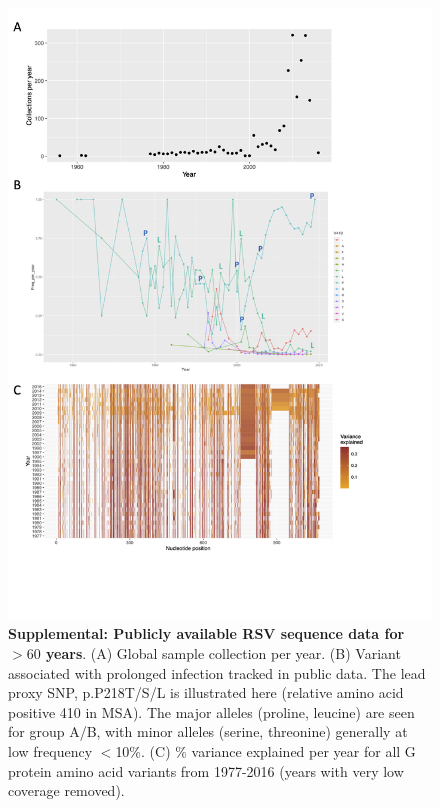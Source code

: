 \documentclass[9pt,lineno]{elife}  %
\begin{document}
\begin{figure}[ht] \hspace{-0.5cm} \begin{center}
    \includegraphics[scale=0.15]{S2}
	\caption{\textbf{Supplemental: Publicly available RSV sequence data for $>60$ years}. (A) Global sample collection per year. (B) Variant associated with prolonged infection tracked in public data. The lead proxy SNP, p.P218T/S/L is illustrated here (relative amino acid positive 410 in MSA). The major alleles (proline, leucine) are seen for group A/B, with minor alleles (serine, threonine) generally at low frequency $<$10\%.
	(C) \% variance explained per year for all G protein amino acid variants from 1977-2016 (years with very low coverage removed).}
	\label{fig:S2} \end{center}
\end{figure}
\end{document}
